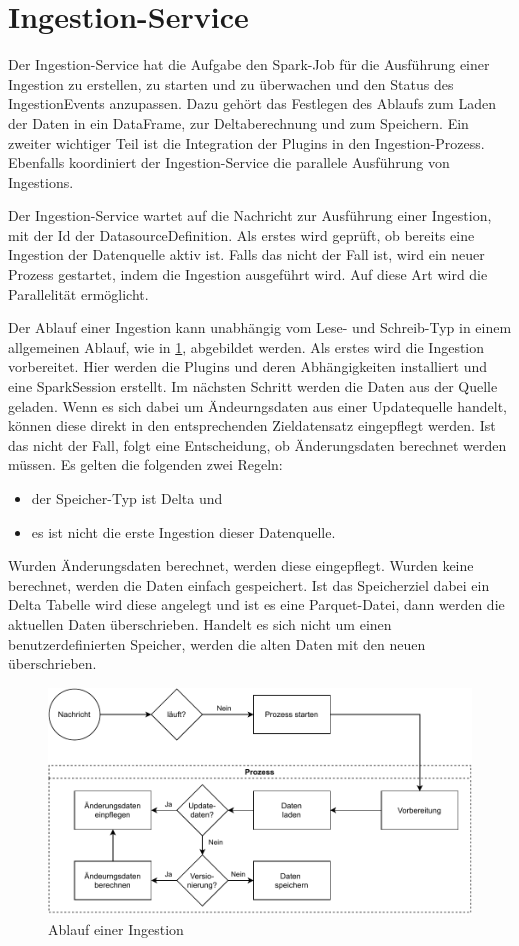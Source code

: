\section{Ingestion-Service}
\label{sec:entw-ingestion}

Der Ingestion-Service hat die Aufgabe den Spark-Job für die Ausführung einer Ingestion zu erstellen, zu starten und zu überwachen und den Status des IngestionEvents anzupassen.
Dazu gehört das Festlegen des Ablaufs zum Laden der Daten in ein DataFrame, zur Deltaberechnung und zum Speichern.
Ein zweiter wichtiger Teil ist die Integration der Plugins in den Ingestion-Prozess.
Ebenfalls koordiniert der Ingestion-Service die parallele Ausführung von Ingestions.

Der Ingestion-Service wartet auf die Nachricht zur Ausführung einer Ingestion, mit der Id der DatasourceDefinition.
Als erstes wird geprüft, ob bereits eine Ingestion der Datenquelle aktiv ist.
Falls das nicht der Fall ist, wird ein neuer Prozess gestartet, indem die Ingestion ausgeführt wird.
Auf diese Art wird die Parallelität ermöglicht.

Der Ablauf einer Ingestion kann unabhängig vom Lese- und Schreib-Typ in einem allgemeinen Ablauf, wie in \cref{fig:ingestion-ablauf}, abgebildet werden.
Als erstes wird die Ingestion vorbereitet.
Hier werden die Plugins und deren Abhängigkeiten installiert und eine SparkSession erstellt.
Im nächsten Schritt werden die Daten aus der Quelle geladen.
Wenn es sich dabei um Ändeurngsdaten aus einer Updatequelle handelt, können diese direkt in den entsprechenden Zieldatensatz eingepflegt werden.
Ist das nicht der Fall, folgt eine Entscheidung, ob Änderungsdaten berechnet werden müssen.
Es gelten die folgenden zwei Regeln: \begin{itemize}
    \item der Speicher-Typ ist Delta und
    \item es ist nicht die erste Ingestion dieser Datenquelle.
\end{itemize}
Wurden Änderungsdaten berechnet, werden diese eingepflegt.
Wurden keine berechnet, werden die Daten einfach gespeichert.
Ist das Speicherziel dabei ein Delta Tabelle wird diese angelegt und ist es eine Parquet-Datei, dann werden die aktuellen Daten überschrieben.
Handelt es sich nicht um einen benutzerdefinierten Speicher, werden die alten Daten mit den neuen überschrieben.

\begin{figure}
    \centering
    \includegraphics[width=\textwidth]{Grafiken/Entwicklung-Ingestion-Ablauf.pdf}
    \caption{Ablauf einer Ingestion}
    \label{fig:ingestion-ablauf}
\end{figure}